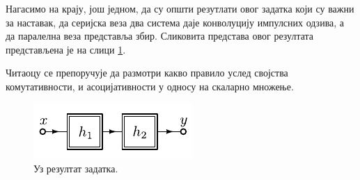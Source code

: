 Нагасимо на крају, још једном, да су општи резутлати овог задатка који су важни за наставак, да серијска веза два система даје конволуцију 
импулсних одзива, а да паралелна веза представља збир. Сликовита представа овог резултата представљена је на слици \ref{fig:\ID.1}.

Читаоцу се препоручује да размотри какво правило услед својства комутативности, и асоцијативности у односу на скаларно множење. 

\begin{figure}[ht!]
    \centering
    \includegraphics[page=3]{fig/ser_par.pdf}
    \caption{Уз резултат задатка. }
    \label{fig:\ID.1}
\end{figure}